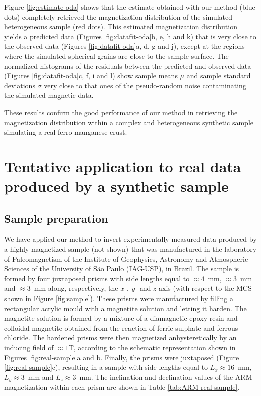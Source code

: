 \documentclass[galley,gc]{agutex}
\begin{document}
\begin{article}
Figure \ref{fig:estimate-oda} shows that the estimate
obtained with our method (blue dots) completely retrieved the 
magnetization distribution of the simulated heterogeneous 
sample (red dots).
This estimated magnetization distribution yields a predicted data
(Figures \ref{fig:datafit-oda}b, e, h and k) that is very
close to the observed data (Figures \ref{fig:datafit-oda}a, 
d, g and j), except at the regions where the simulated spherical
grains are close to the sample surface.
The normalized histograms of the residuals between the predicted and
observed data (Figures \ref{fig:datafit-oda}c, f, i and l) show
sample means $\mu$ and sample standard deviations $\sigma$
very close to that ones of the pseudo-random noise 
contaminating the simulated magnetic data.

These results confirm the good performance of our method
in retrieving the magnetization distribution within a complex and
heterogeneous synthetic sample simulating a real ferro-manganese
crust.

\section{Tentative application to real data produced by a synthetic sample}
\label{sec:Tentative application to real data produced by a synthetic sample}

\subsection{Sample preparation}
\label{subsec:Sample preparation}

We have applied our method to invert experimentally measured
data produced by a highly magnetized sample (not shown) 
that was manufactured in the laboratory of Paleomagnetism of the
Institute of Geophysics, Astronomy and Atmospheric Sciences of the
University of S\~{a}o Paulo (IAG-USP), in Brazil.
The sample is formed by four juxtaposed prisms with side lengths
equal to $\approx 4$~mm, $\approx 3$~mm and $\approx 3$~mm along, 
respectively, the $x$-,
$y$- and $z$-axis (with respect to the MCS shown in Figure 
\ref{fig:sample}).
These prisms were manufactured by filling a rectangular 
acrylic mould with a magnetite solution and letting it harden.
The magnetite solution is formed by a mixture of a diamagnetic 
epoxy resin and colloidal magnetite obtained from the
reaction of ferric sulphate and ferrous chloride.
The hardened prisms were then magnetized anhysteretically
by an inducing field of $\approx 1$T, according to the
schematic representation shown in Figures 
\ref{fig:real-sample}a and b.
Finally, the prisms were juxtaposed (Figure \ref{fig:real-sample}c),
resulting in a sample with side lengths equal to
$L_{x} \approx 16$~mm, $L_{y} \approx 3$~mm and 
$L_{z} \approx 3$~mm. The inclination and declination values 
of the ARM magnetization within each prism
are shown in Table \ref{tab:ARM-real-sample}.


\end{article}
\end{document}

